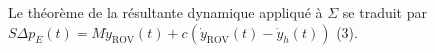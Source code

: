 Le théorème de la résultante dynamique appliqué à $\Sigma$ se traduit par 
$ S\Delta p_E(t)=M\ddot y_{\text{ROV}}(t)+c(\dot y_{\text{ROV}}(t)-\dot y_h(t) ) $ (3).



%
%
%
%
% 
% 
